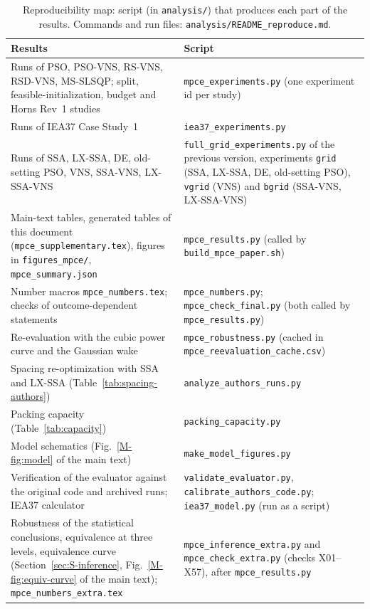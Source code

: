 \documentclass[10pt]{article}
\begin{document}
\begin{table}[!htb]
\centering
\caption{Reproducibility map: script (in \texttt{analysis/}) that produces each part of the results. Commands and run files: \texttt{analysis/README\_reproduce.md}.}
\label{tab:S-repro}
\footnotesize\setlength{\tabcolsep}{4pt}
\begin{tabular}{>{\raggedright\arraybackslash}p{}>{\raggedright\arraybackslash}p{}}
\toprule
Results & Script \\
\midrule
Runs of PSO, PSO-VNS, RS-VNS, RSD-VNS, MS-SLSQP; split, feasible-initialization, budget and Horns Rev~1 studies & \texttt{mpce\_experiments.py} (one experiment id per study) \\
Runs of IEA37 Case Study~1 & \texttt{iea37\_experiments.py} \\
Runs of SSA, LX-SSA, DE, old-setting PSO, VNS, SSA-VNS, LX-SSA-VNS & \texttt{full\_grid\_experiments.py} of the previous version, experiments \texttt{grid} (SSA, LX-SSA, DE, old-setting PSO), \texttt{vgrid} (VNS) and \texttt{bgrid} (SSA-VNS, LX-SSA-VNS) \\
Main-text tables, generated tables of this document (\texttt{mpce\_supplementary.tex}), figures in \texttt{figures\_mpce/}, \texttt{mpce\_summary.json} & \texttt{mpce\_results.py} (called by \texttt{build\_mpce\_paper.sh}) \\
Number macros \texttt{mpce\_numbers.tex}; checks of outcome-dependent statements & \texttt{mpce\_numbers.py}; \texttt{mpce\_check\_final.py} (both called by \texttt{mpce\_results.py}) \\
Re-evaluation with the cubic power curve and the Gaussian wake & \texttt{mpce\_robustness.py} (cached in \texttt{mpce\_reevaluation\_cache.csv}) \\
Spacing re-optimization with SSA and LX-SSA (Table~\ref{tab:spacing-authors}) & \texttt{analyze\_authors\_runs.py} \\
Packing capacity (Table~\ref{tab:capacity}) & \texttt{packing\_capacity.py} \\
Model schematics (Fig.~\ref{M-fig:model} of the main text) & \texttt{make\_model\_figures.py} \\
Verification of the evaluator against the original code and archived runs; IEA37 calculator & \texttt{validate\_evaluator.py}, \texttt{calibrate\_authors\_code.py}; \texttt{iea37\_model.py} (run as a script) \\
Robustness of the statistical conclusions, equivalence at three levels, equivalence curve (Section~\ref{sec:S-inference}, Fig.~\ref{M-fig:equiv-curve} of the main text); \texttt{mpce\_numbers\_extra.tex} & \texttt{mpce\_inference\_extra.py} and \texttt{mpce\_check\_extra.py} (checks X01--X57), after \texttt{mpce\_results.py} \\

\end{tabular}
\end{table}
\end{document}
